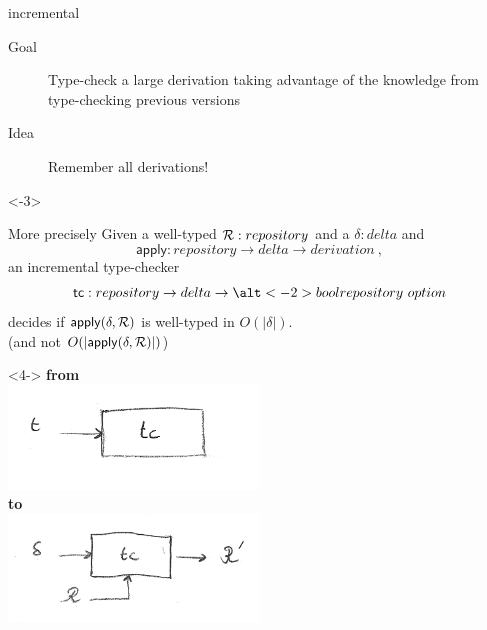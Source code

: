 \documentclass[ignorenonframetext,red]{beamer}
\begin{document}
\begin{frame}{ incremental
    }
    \begin{description}
    \item[Goal] Type-check a large derivation taking advantage of the
      knowledge from type-checking previous versions
    \item[Idea] Remember all derivations!
    \end{description}
    \pause \inXLF
    \begin{overlayarea}\textwidth{12em}
      \begin{onlyenv}<-3>
        \begin{block}{More precisely}
          Given a well-typed $\mathcal{R} : repository$ and a $\delta : delta$
          and $$\mathsf{apply} : repository \to delta \to derivation\ ,$$an
          incremental type-checker $$\mathsf{tc} : repository \to
          delta \to \alt<-2>{bool}{repository\ option} $$ decides if
          $\mathsf{apply}(\delta,\mathcal{R})$ is
          well-typed in $O(|\delta|)$. \\
          {\hfill\scriptsize (and not
            $O(|\mathsf{apply}(\delta,\mathcal{R})|)$)}
        \end{block}
      \end{onlyenv}
      \begin{onlyenv}<4->
        \textbf{from}\\
        {\includegraphics[width=0.5\textwidth]{images/tc-classic.png}} \\
        \textbf{to}\\
        {\includegraphics[width=0.5\textwidth]{images/tc-delta1.png}} \\
      \end{onlyenv}
    \end{overlayarea}
\end{frame}
\end{document}
